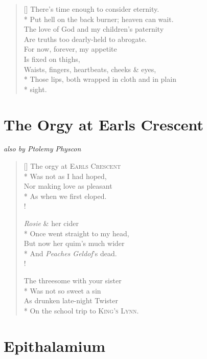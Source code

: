 \documentclass[openany]{amsbook}
\newcommand{\poeticmarginnote}[1]{\marginnote{\footnotesize #1}}
\begin{document}
\begin{verse}[\versewidth]
    There's time enough to consider eternity.\\*
    \vin Put hell on the back burner; heaven can wait.\\
    The love of God and my children's paternity\\
    \vin Are truths too dearly-held to abrogate.\\
    \vin \vin For now, forever, my appetite\\
    \vin \vin \vin Is fixed on thighs,\\
    \vin \vin \vin Waists, fingers, heartbeats, cheeks \& eyes,\\*
    \vin \vin Those lips, both wrapped in cloth and in plain\\*
    \vin \vin \vin \vin sight.
\end{verse}


\chapter*{The Orgy at Earls Crescent}

\begin{center}
{\it also by Ptolemy Physcon}
\end{center}

\bigskip
\bigskip

\begin{verse}[\versewidth]
The orgy at \textsc{Earls Crescent}\\*
\vin Was not as I had hoped,\\
Nor making love as pleasant\\*
\vin As when we first eloped.\\!

\textit{Rosie} \& her cider\poeticmarginnote{Laurie Lee}\\*
\vin Once went straight to my head,\\
But now her quim's much wider\\*
\vin And \textit{Peaches Geldof}'s dead.\\!

The threesome with your sister\\*
\vin Was not so sweet a sin\\
As drunken late-night Twister\\*
\vin On the school trip to \textsc{King's Lynn}.
\end{verse}


\chapter*{Epithalamium}
\end{document}
